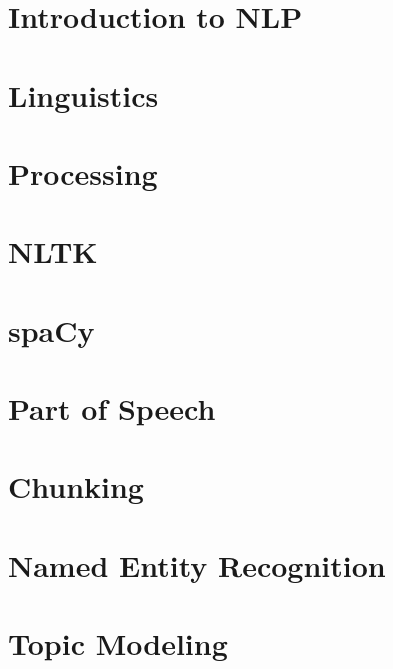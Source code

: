 \section[Intro]{Introduction to NLP}


\section[Ling]{Linguistics}

\section[Pre]{Processing}

\section[NLTK]{NLTK}


\section[spaCy]{spaCy}


\section[POS]{Part of Speech}





\section[Chunk]{Chunking}



\section[NER]{Named Entity Recognition}




\section[Topics]{Topic Modeling}


